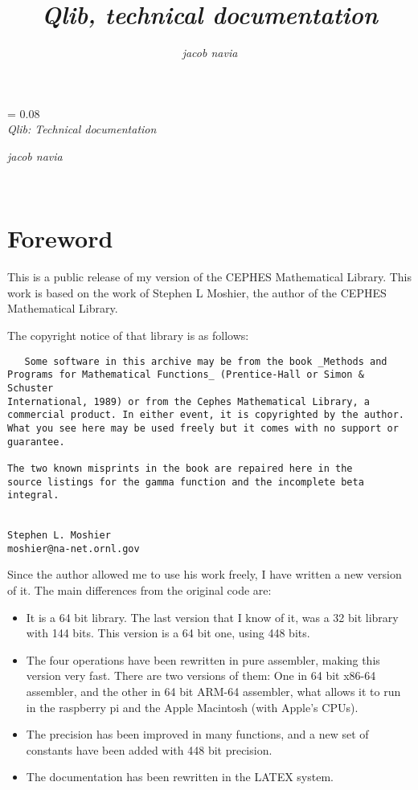 \documentclass[10pt,a4paper,x11names]{memoir} %
\title{ \textsl{Qlib, technical documentation}}
\author{ \textsl{jacob navia}}
\newcommand*{\titleJT}{\begingroup%
	\drop = 0.08\textheight \vspace*{\drop}
	\hspace*{0.3\textwidth} {}\\[1\drop]
	\hspace*{0.2\textwidth}
	{\HUGE\itshape\raggedleft Qlib: Technical documentation}\par \vspace{13cm} {\raggedleft\Huge\itshape jacob navia\par} \vfill \hspace*{0.3\textwidth}{\Large \raggedleft }\\[0.5\baselineskip] \hspace*{0.3\textwidth}{\Large } \vspace*{\drop} \endgroup}
\newlength{\drop}
\begin{document}
\setcounter{tocdepth}{5}
\pagestyle{empty} \titleJT
\cleardoublepage
\pagestyle{headings}
\tableofcontents


\lstset{language=C,numbers=left}
\chapter{Foreword}
This is a public release of my version of the CEPHES Mathematical Library. This work is based on the work of Stephen L Moshier, the author of the CEPHES Mathematical Library.

The copyright notice of that library is as follows:
\begin{verbatim}
   Some software in this archive may be from the book _Methods and
Programs for Mathematical Functions_ (Prentice-Hall or Simon & Schuster
International, 1989) or from the Cephes Mathematical Library, a
commercial product. In either event, it is copyrighted by the author.
What you see here may be used freely but it comes with no support or
guarantee.

The two known misprints in the book are repaired here in the
source listings for the gamma function and the incomplete beta
integral.


Stephen L. Moshier
moshier@na-net.ornl.gov
\end{verbatim}

Since the author allowed me to use his work freely, I have written a new version of it. The main differences from the original code are:
\begin{itemize}
	\item It is a 64 bit library. The last version that I know of it, was a 32 bit library with 144 bits. This version is a 64 bit one, using 448 bits.
	\item The four operations have been rewritten in pure assembler, making this version very fast. There are two versions of them: One in 64 bit x86-64 assembler, and the other in 64 bit ARM-64 assembler, what allows it to run in the raspberry pi and the 
	Apple Macintosh (with Apple's CPUs).
	\item The precision has been improved in many functions, and a new set of constants have been added with 448 bit precision.
	\item The documentation has been rewritten in the LATEX
	 system.
\end{itemize}
\end{document}

